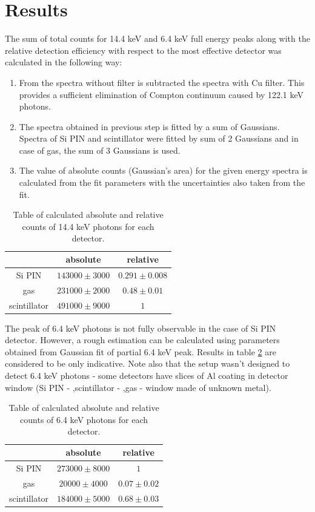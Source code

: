 \section{Results}
The sum of total counts for 14.4 keV and 6.4 keV full energy peaks along with the relative detection efficiency with respect to the most effective detector was calculated in the following way:

\begin{enumerate}
\item From the spectra without filter is subtracted the spectra with Cu filter. This provides a sufficient elimination of Compton continuum caused by 122.1 keV photons. 
\item The spectra obtained in previous step is fitted by a sum of Gaussians. Spectra of Si PIN and scintillator were fitted by sum of 2 Gaussians and in case of gas, the sum of 3 Gaussians is used.
\item The value of absolute counts (Gaussian's area) for the given energy spectra is calculated from the fit parameters with the uncertainties also taken from the fit.
\end{enumerate}




\begin{table}[H]
\centering
\begin{tabular}{|c|c|c|}
\hline
   & absolute & relative \\ \hline
Si PIN & $143000 \pm 3000$    & $0.291 \pm 0.008$  \\ \hline
gas & $231000 \pm 2000$    & $0.48 \pm  0.01$ \\ \hline
scintillator  & $491000 \pm 9000$    & $1$ \\ \hline
\end{tabular}
\caption{Table of calculated absolute and relative counts of 14.4 keV photons for each detector.}
 \label{144kevEFF}
\end{table}


The peak of 6.4 keV photons is not fully observable in the case of Si PIN detector. However, a rough estimation can be calculated using parameters obtained from Gaussian fit of partial 6.4 keV peak. Results in table \ref{64kevEFF} are considered to be only indicative. Note also that the setup wasn't designed to detect 6.4 keV photons - some detectors have slices of Al coating in detector window (Si PIN - ,scintillator - ,gas - window made of unknown metal).  

\begin{table}[H]
\centering
\begin{tabular}{|c|c|c|}
\hline
   & absolute & relative \\ \hline
Si PIN & $273000 \pm 8000$    & $1$  \\ \hline
gas & $20000 \pm 4000$    & $0.07 \pm 0.02$ \\ \hline
scintillator  & $184000 \pm 5000$    & $0.68 \pm 0.03$ \\ \hline
\end{tabular}
\caption{Table of calculated absolute and relative counts of 6.4 keV photons for each detector.}
 \label{64kevEFF}
\end{table}


